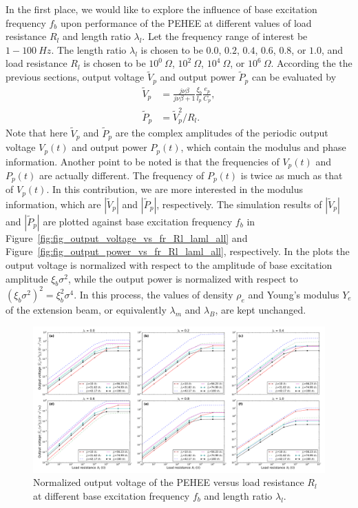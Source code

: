 \documentclass{elsarticle}
\begin{document}
In the first place, we would like to explore the influence of base excitation frequency $f_b$ upon performance of the PEHEE at different values of load resistance $R_l$ and length ratio $\lambda_l$. Let the frequency range of interest be $1 - 100\ Hz$. The length ratio $\lambda_l$ is chosen to be $0.0$, $0.2$, $0.4$, $0.6$, $0.8$, or $1.0$, and load resistance $R_l$ is chosen to be $10^0\ \Omega$, $10^2\ \Omega$, $10^4\ \Omega$, or $10^6\ \Omega$. According the the previous sections, output voltage $\tilde{V}_p$ and output power $\tilde{P}_p$ can be evaluated by
\begin{equation}
    \begin{aligned}
        \tilde{V}_p &= \frac{j \nu \beta}{j \nu \beta + 1} \frac{\xi_b}{l_p} \frac{e_p}{C_p}, \\
        \tilde{P}_p &=  \tilde{V}_p^2 / R_l.
    \end{aligned}
\end{equation}
Note that here $\tilde{V}_p$ and $\tilde{P}_p$ are the complex amplitudes of the periodic output voltage $V_p(t)$ and output power $P_p(t)$, which contain the modulus and phase information. Another point to be noted is that the frequencies of $V_p(t)$ and $P_p(t)$ are actually different. The frequency of $P_p(t)$ is twice as much as that of $V_p(t)$. In this contribution, we are more interested in the modulus information, which are $|\tilde{V}_p|$ and $|\tilde{P}_p|$, respectively. The simulation results of $|\tilde{V}_p|$ and $|\tilde{P}_p|$ are plotted against base excitation frequency $f_b$ in Figure~\ref{fig:fig_output_voltage_vs_fr_Rl_laml_all} and Figure~\ref{fig:fig_output_power_vs_fr_Rl_laml_all}, respectively. In the plots the output voltage is normalized with respect to the amplitude of base excitation amplitude $\xi_b \sigma^2$, while the output power is normalized with respect to $\left(\xi_b \sigma^2\right)^2 = \xi_b^2 \sigma^4$. In this process, the values of density $\rho_e$ and Young's modulus $Y_e$ of the extension beam, or equivalently $\lambda_m$ and $\lambda_B$, are kept unchanged.



\begin{figure}[!htbp]
    \centering
    \includegraphics[width=\textwidth]{./fig_vol_laml_list_vs_fr_Rl}
    \caption{ Normalized output voltage of the PEHEE versus load resistance $R_l$ at different base excitation frequency $f_b$ and length ratio $\lambda_l$. }
    \label{fig:fig_vol_laml_list_vs_fr_Rl}
\end{figure}
\end{document}
